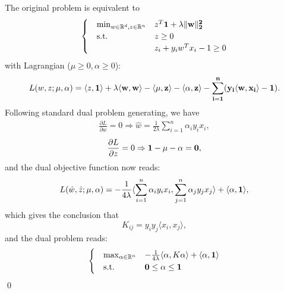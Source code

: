 \documentclass{article}
\begin{document}
\begin{myproof}[proof of 1.]
	The original problem is equivalent to 
	\begin{equation}
	\begin{cases}\label{eq_problem_2}
	\quad \min_{w\in\mathbb{R}^d, z\in \mathbb{R}^n} &z^T \bf{1}+\lambda \|w\|_2^2\\
	\quad \mbox{s.t. } & z\geq 0 \\
	                   & z_i+y_i w^T x_i - 1\geq 0 \\
	\end{cases}
	\end{equation}
	with Lagrangian ($\mu\geq 0, \alpha\geq 0$):
	\begin{equation}\label{eq_lagrange}
	L(w,z;\mu,\alpha) = \langle z, \bf{1}\rangle +\lambda \langle w, w\rangle-\langle \mu, z \rangle - \langle \alpha, z \rangle - \sum_{i=1}^n (y_i \langle w, x_i\rangle -1).
	\end{equation}
	Following standard dual problem generating, we have
	\begin{eqnarray}\label{eq_w_hat}
	\frac{\partial L}{\partial w}=0 \Rightarrow \hat{w} = \frac{1}{2\lambda} \sum_{i=1}^{n}\alpha_i y_i x_i,
	\end{eqnarray}
	\begin{eqnarray}
	\frac{\partial L}{\partial z}=0 \Rightarrow \bf{1} - \mu - \alpha = 0,
	\end{eqnarray}
	and the dual objective function now reads:
	\begin{equation}
	L(\hat{w},\hat{z};\mu,\alpha)=-\frac{1}{4\lambda}\langle \sum_{i=1}^{n}\alpha_i y_i x_i, \sum_{j=1}^{n}\alpha_j y_j x_j\rangle+\langle\alpha, \bf{1}\rangle,
	\end{equation}
	which gives the conclusion that
	\begin{equation}
	K_{ij} = y_iy_j\langle x_i, x_j\rangle,
	\end{equation}
	and the dual problem reads:
	\begin{equation}
	\begin{cases}\label{eq_problem_dual}
	\quad \max_{\alpha\in \mathbb{R}^n} &-\frac{1}{4\lambda}\langle\alpha,K\alpha\rangle + \langle\alpha,\bf{1}\rangle\\
	\quad \mbox{s.t. } & \bf{0}\leq \alpha\leq \bf{1} 
	\end{cases}
	\end{equation}
	\qed
\end{myproof}
\end{document}
